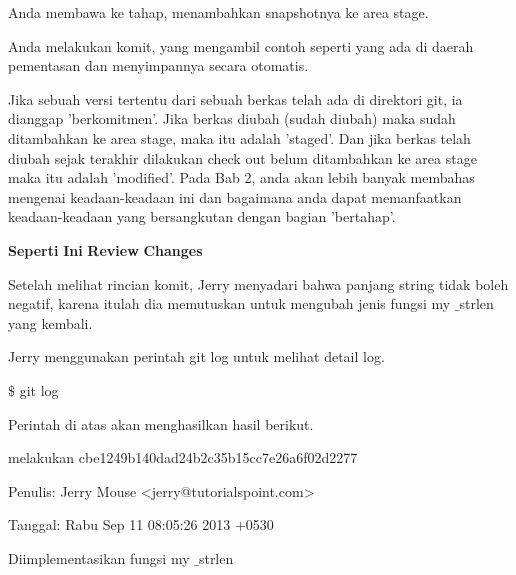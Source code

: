 \noindent 
Anda membawa ke tahap, menambahkan snapshotnya ke area stage. \par
\noindent 
Anda melakukan komit, yang mengambil contoh seperti yang ada di daerah pementasan dan menyimpannya secara otomatis. \par
\noindent 
Jika sebuah versi tertentu dari sebuah berkas telah ada di direktori git, ia dianggap 'berkomitmen'. Jika berkas diubah (sudah diubah) maka sudah ditambahkan ke area stage, maka itu adalah 'staged'. Dan jika berkas telah diubah sejak terakhir dilakukan check out belum ditambahkan ke area stage maka itu adalah 'modified'. Pada Bab 2, anda akan lebih banyak membahas mengenai keadaan-keadaan ini dan bagaimana anda dapat memanfaatkan keadaan-keadaan yang bersangkutan dengan bagian 'bertahap'. \par
\vspace{12pt}
\noindent 
{\fontsize{14pt}{14pt}\selectfont \textbf{Seperti}\textbf{ }\textbf{Ini}\textbf{ Review}\textbf{ Changes} \\} \par
\noindent 
Setelah melihat rincian komit, Jerry menyadari bahwa panjang string tidak boleh negatif, karena itulah dia memutuskan untuk mengubah jenis fungsi my $  \_  $strlen yang kembali. \par
\vspace{12pt}
\noindent 
 \hspace*{0.5in} Jerry menggunakan perintah git log untuk melihat detail log. \par
\vspace{12pt}
\noindent 
  $  \$  $ git log \par
\noindent 
Perintah di atas akan menghasilkan hasil berikut. \par
\vspace{12pt}
\vspace{12pt}
\noindent 
 \hspace*{0.5in}  \hspace*{0.5in} melakukan cbe1249b140dad24b2c35b15cc7e26a6f02d2277 \par
\noindent 
 \hspace*{0.5in} Penulis: Jerry Mouse <jerry@tutorialspoint.com> \par
\noindent 
 \hspace*{0.5in} Tanggal: Rabu Sep 11 08:05:26 2013 +0530 \par
\noindent 
 \hspace*{0.5in} \vspace{12pt}
\noindent 
 \hspace*{0.5in} Diimplementasikan fungsi my $  \_  $strlen \par
